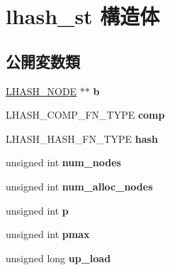 \hypertarget{structlhash__st}{}\section{lhash\+\_\+st 構造体}
\label{structlhash__st}
\subsection*{公開変数類}
\begin{DoxyCompactItemize}
\item 
\hypertarget{structlhash__st_a270d10bf31f3f917e12d700b27960458}{}\hyperlink{structlhash__node__st}{L\+H\+A\+S\+H\+\_\+\+N\+O\+D\+E} $\ast$$\ast$ {\bfseries b}\label{structlhash__st_a270d10bf31f3f917e12d700b27960458}

\item 
\hypertarget{structlhash__st_a225e9a348c78a6e7504855c6b07ebbb5}{}L\+H\+A\+S\+H\+\_\+\+C\+O\+M\+P\+\_\+\+F\+N\+\_\+\+T\+Y\+P\+E {\bfseries comp}\label{structlhash__st_a225e9a348c78a6e7504855c6b07ebbb5}

\item 
\hypertarget{structlhash__st_a4621a7df2e70d17d284b8c96e487ee66}{}L\+H\+A\+S\+H\+\_\+\+H\+A\+S\+H\+\_\+\+F\+N\+\_\+\+T\+Y\+P\+E {\bfseries hash}\label{structlhash__st_a4621a7df2e70d17d284b8c96e487ee66}

\item 
\hypertarget{structlhash__st_add0a7c97093083aef433f6289fbac653}{}unsigned int {\bfseries num\+\_\+nodes}\label{structlhash__st_add0a7c97093083aef433f6289fbac653}

\item 
\hypertarget{structlhash__st_a4a908c57d4662d2db5b823f27c6c8b4c}{}unsigned int {\bfseries num\+\_\+alloc\+\_\+nodes}\label{structlhash__st_a4a908c57d4662d2db5b823f27c6c8b4c}

\item 
\hypertarget{structlhash__st_aeb92fe48394859c62a9c1d80feafbcf8}{}unsigned int {\bfseries p}\label{structlhash__st_aeb92fe48394859c62a9c1d80feafbcf8}

\item 
\hypertarget{structlhash__st_a4b7d60fb615541278ab1d04b94a5d209}{}unsigned int {\bfseries pmax}\label{structlhash__st_a4b7d60fb615541278ab1d04b94a5d209}

\item 
\hypertarget{structlhash__st_a1a393608789b64b8a28fa35bf8181ccf}{}unsigned long {\bfseries up\+\_\+load}\label{structlhash__st_a1a393608789b64b8a28fa35bf8181ccf}


\end{DoxyCompactItemize}
